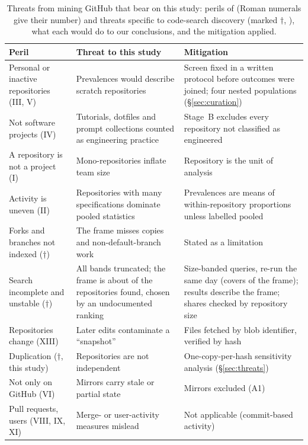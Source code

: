 \begin{table}[t]
\caption{Threats from mining GitHub that bear on this study: perils of \citet{kalliamvakou2016promises} (Roman
numerals give their number) and threats specific to code-search discovery (marked $\dagger$,
\citealp{GitHubSearchAPIDoc}), what each would do to our conclusions, and the mitigation applied.}
\label{tab:perils}
\footnotesize
\begin{tabular}{@{}>{\raggedright\arraybackslash}p{2.8cm}>{\raggedright\arraybackslash}p{3.9cm}>{\raggedright\arraybackslash}p{4.3cm}@{}}
\toprule
\textbf{Peril} & \textbf{Threat to this study} & \textbf{Mitigation} \\
\midrule
Personal or inactive repositories (III, V) & Prevalences would describe scratch repositories &
Screen fixed in a written protocol before outcomes were joined; four nested populations
(\S\ref{sec:curation}) \\
Not software projects (IV) & Tutorials, dotfiles and prompt collections counted as engineering practice &
Stage~B excludes every repository not classified as engineered \\
A repository is not a project (I) & Mono-repositories inflate team size & Repository is the unit of analysis \\
Activity is uneven (II) & Repositories with many specifications dominate pooled statistics & Prevalences are means of
within-repository proportions unless labelled pooled \\
Forks and branches not indexed ($\dagger$) & The frame misses copies and non-default-branch work & Stated as a
limitation \\
Search incomplete and unstable ($\dagger$) & All bands truncated; the frame is about \pctFrameOfRerun{} of the
repositories found, chosen by an undocumented ranking & Size-banded queries, re-run the same day (covers
\pctRerunOverlap{} of the frame); results describe the frame; shares checked by repository size \\
Repositories change (XIII) & Later edits contaminate a ``snapshot'' & Files fetched by blob identifier, verified by hash \\
Duplication ($\dagger$, this study) & Repositories are not independent & One-copy-per-hash sensitivity analysis
(\S\ref{sec:threats}) \\
Not only on GitHub (VI) & Mirrors carry stale or partial state & Mirrors excluded (A1) \\
Pull requests, users (VIII, IX, XI) & Merge- or user-activity measures mislead & Not applicable (commit-based activity) \\
\bottomrule
\end{tabular}
\end{table}
